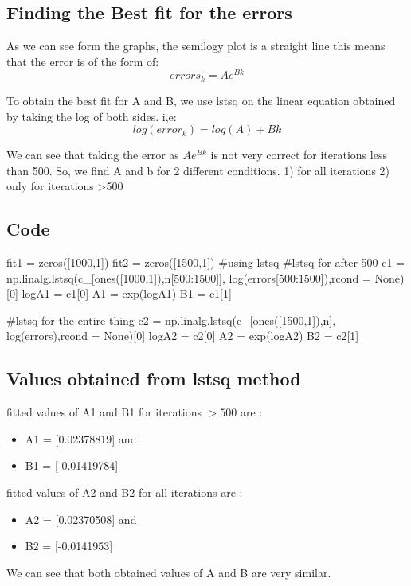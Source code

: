 \documentclass[11pt]{article}
\begin{document}
\subsection{Finding the Best fit for the errors}
As we can see form the graphs, the semilogy plot is a straight line this means that the error is of the form of:
\begin{equation}
    errors_k = Ae^{Bk}
\end{equation}

To obtain the best fit for A and B, we use lstsq on the linear equation obtained by taking the log of both sides. i,e:
\begin{equation}
    log(error_k) = log(A) + Bk
\end{equation}

We can see that taking the error as $Ae^{Bk}$ is not very correct for iterations less than 500. So, we find A and b for 2 different conditions.
1) for all iterations
2) only for iterations >500

\subsection{Code}
\begin{python}
fit1 = zeros([1000,1])
fit2 = zeros([1500,1])
#using lstsq
#lstsq for after 500
c1 = np.linalg.lstsq(c_[ones([1000,1]),n[500:1500]], log(errors[500:1500]),rcond = None)[0]
logA1 = c1[0]
A1 = exp(logA1)
B1 = c1[1]

#lstsq for the entire thing
c2 = np.linalg.lstsq(c_[ones([1500,1]),n], log(errors),rcond = None)[0]
logA2 = c2[0]
A2 = exp(logA2)
B2 = c2[1]
\end{python}

\subsection{Values obtained from lstsq method}
fitted values of A1 and B1 for iterations $>500$ are : 
\begin{itemize}
    \item A1 = [0.02378819] and
    \item B1 = [-0.01419784]
\end{itemize}

fitted values of A2 and B2 for all iterations are : 
\begin{itemize}
    \item A2 = [0.02370508] and
    \item B2 = [-0.0141953]
\end{itemize}
We can see that both obtained values of A and B are very similar.
\end{document}
